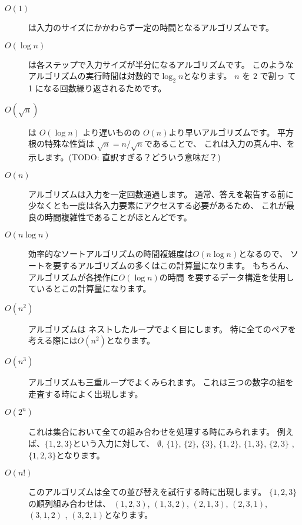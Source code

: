 \begin{description}
\item[$O(1)$]
 は入力のサイズにかかわらず一定の時間となるアルゴリズムです。

\item[$O(\log n)$]
 は各ステップで入力サイズが半分になるアルゴリズムです。
このようなアルゴリズムの実行時間は対数的で$\log_2 n$となります。
$n$ を $2$ で割っ て 1 になる回数繰り返されるためです。

\item[$O(\sqrt n)$]
 は
$O(\log n)$ より遅いものの $O(n)$より早いアルゴリズムです。
平方根の特殊な性質は
$\sqrt n = n/\sqrt n$であることで、
これは入力の真ん中、を示します。(TODO: 直訳すぎる？どういう意味だ？)

\item[$O(n)$]
アルゴリズムは入力を一定回数通過します。
通常、答えを報告する前に少なくとも一度は各入力要素にアクセスする必要があるため、
これが最良の時間複雑性であることがほとんどです。

\item[$O(n \log n)$]
効率的なソートアルゴリズムの時間複雑度は$O(n \log n)$となるので、
ソートを要するアルゴリズムの多くはこの計算量になります。
もちろん、アルゴリズムが各操作に$O( \log n)$の時間
を要するデータ構造を使用しているとこの計算量になります。

\item[$O(n^2)$]
 アルゴリズムは
ネストしたループでよく目にします。
特に全てのペアを考える際には$O(n^2)$となります。

\item[$O(n^3)$]
アルゴリズムも三重ループでよくみられます。
これは三つの数字の組を走査する時によく出現します。

\item[$O(2^n)$]
これは集合において全ての組み合わせを処理する時にみられます。
例えば、$\{1,2,3\}$という入力に対して、
$\emptyset$, $\{1\}$, $\{2\}$, $\{3\}$, $\{1,2\}$,
$\{1,3\}$, $\{2,3\}$ , $\{1,2,3\}$となります。

\item[$O(n!)$]
このアルゴリズムは全ての並び替えを試行する時に出現します。
$\{1,2,3\}$ の順列組み合わせは、
$(1,2,3)$, $(1,3,2)$, $(2,1,3)$, $(2,3,1)$,
$(3,1,2)$ , $(3,2,1)$となります。

\end{description}


